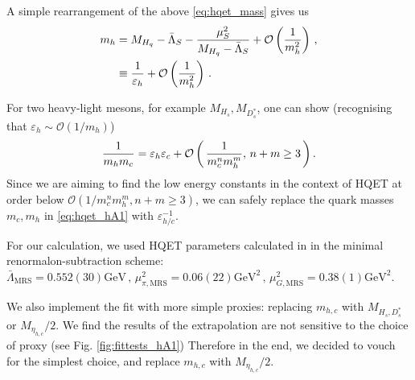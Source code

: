 A simple rearrangement of the above \eqref{eq:hqet_mass} gives us
\begin{align}
  \label{eq:epsilon_h}
  m_{h} &= M_{H_q} - \bar{\Lambda}_S - { \mu^2_S \over M_{H_q} - \bar{\Lambda}_S} + \mathcal{O}\left({1\over m_h^2}\right)\,, \\ \nonumber
  & \equiv {1\over\varepsilon_{h}} + \mathcal{O}\left({1\over m_h^2}\right)\,.
\end{align}

For two heavy-light mesons, for example $M_{H_s},M_{D_s^*}$, one can show (recognising that $\varepsilon_{h}\sim \mathcal{O}(1/m_h)$)
\begin{align}
  {1\over m_{h} m_{c}} = \varepsilon_{h}\varepsilon_{c} + \mathcal{O}\left( \, {1\over m_c^n m_h^m}, \, n+m\geq 3 \, \right).
\end{align}
Since we are aiming to find the low energy constants in the context of HQET at order below $\mathcal{O}( 1/ m_c^n m_h^m, n+m\geq 3 )$, we can safely replace the quark masses $m_c,m_h$ in \eqref{eq:hqet_hA1} with $\varepsilon_{h/c}^{-1}$.

For our calculation, we used HQET parameters calculated in \cite{Bazavov:2018omf} in the minimal renormalon-subtraction scheme: $\bar{\Lambda}_{\text{MRS}} = 0.552(30)\text{GeV} \,,\, \mu^2_{\pi,\text{MRS}} = 0.06(22)\text{GeV}^2 \,, \, \mu^2_{G,\text{MRS}} = 0.38(1)\text{GeV}^2$.

We also implement the fit with more simple proxies: replacing $m_{h,c}$ with $M_{H_s,D^*_s}$ or $M_{\eta_{h,c}}/2$. We find the results of the extrapolation are not sensitive to the choice of proxy (see Fig. \ref{fig:fittests_hA1}) Therefore in the end, we decided to vouch for the simplest choice, and replace $m_{h,c}$ with $M_{\eta_{h,c}}/2$.

